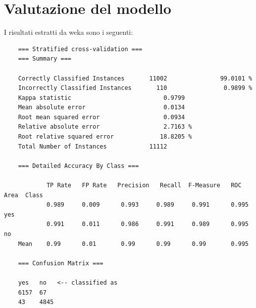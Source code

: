 \section{Valutazione del modello}
\label{Risultati}
I risultati estratti da weka sono i seguenti: 
{\footnotesize
\begin{verbatim}
	=== Stratified cross-validation ===
	=== Summary ===
	
	Correctly Classified Instances       11002               99.0101 %
	Incorrectly Classified Instances       110                0.9899 %
	Kappa statistic                          0.9799
	Mean absolute error                      0.0134
	Root mean squared error                  0.0934
	Relative absolute error                  2.7163 %
	Root relative squared error             18.8205 %
	Total Number of Instances            11112     
	
	=== Detailed Accuracy By Class ===
	
            TP Rate   FP Rate   Precision   Recall  F-Measure   ROC Area  Class
            0.989     0.009      0.993     0.989     0.991      0.995      yes
            0.991     0.011      0.986     0.991     0.989      0.995      no
	Mean    0.99      0.01       0.99      0.99      0.99       0.995
	
	=== Confusion Matrix ===
	
	yes   no   <-- classified as
	6157  67 
	43    4845
\end{verbatim}
}
